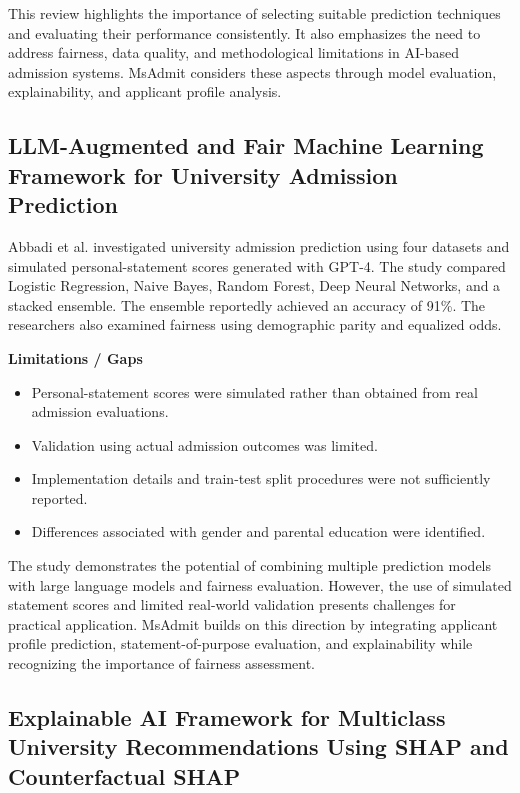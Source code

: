 This review highlights the importance of selecting suitable prediction
techniques and evaluating their performance consistently. It also
emphasizes the need to address fairness, data quality, and
methodological limitations in AI-based admission systems. MsAdmit
considers these aspects through model evaluation, explainability, and
applicant profile analysis.

\subsection{LLM-Augmented and Fair Machine Learning Framework for University Admission Prediction}

Abbadi et al. \cite{abbadi2025} investigated university admission
prediction using four datasets and simulated personal-statement
scores generated with GPT-4. The study compared Logistic Regression,
Naive Bayes, Random Forest, Deep Neural Networks, and a stacked
ensemble. The ensemble reportedly achieved an accuracy of 91\%.
The researchers also examined fairness using demographic parity
and equalized odds.

\noindent\textbf{Limitations / Gaps}
\begin{itemize}
    \item Personal-statement scores were simulated rather than obtained
    from real admission evaluations.
    \item Validation using actual admission outcomes was limited.
    \item Implementation details and train-test split procedures were
    not sufficiently reported.
    \item Differences associated with gender and parental education
    were identified.
\end{itemize}

The study demonstrates the potential of combining multiple prediction
models with large language models and fairness evaluation. However,
the use of simulated statement scores and limited real-world
validation presents challenges for practical application. MsAdmit
builds on this direction by integrating applicant profile prediction,
statement-of-purpose evaluation, and explainability while recognizing
the importance of fairness assessment.

\subsection{Explainable AI Framework for Multiclass University Recommendations Using SHAP and Counterfactual SHAP}

